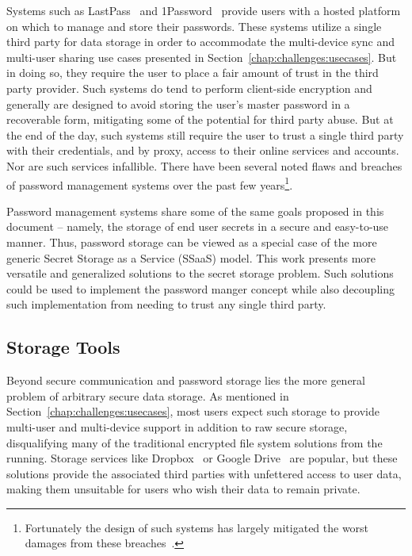 Systems such as LastPass~\cite{lastpass} and
1Password~\cite{onepassword} provide users with a hosted platform on
which to manage and store their passwords. These systems utilize a
single third party for data storage in order to accommodate the
multi-device sync and multi-user sharing use cases presented in
Section~\ref{chap:challenges:usecases}. But in doing so, they require
the user to place a fair amount of trust in the third party
provider. Such systems do tend to perform client-side encryption and
generally are designed to avoid storing the user's master password in
a recoverable form, mitigating some of the potential for third party
abuse. But at the end of the day, such systems still require the user
to trust a single third party with their credentials, and by proxy,
access to their online services and accounts. Nor are such services
infallible. There have been several noted flaws and breaches of
password management systems over the past few
years\footnote{Fortunately the design of such systems has largely
  mitigated the worst damages from these
  breaches~\cite{ducklin2015}.}\cite{blackhat-lastpass,
  changedmy-lastpass, lastpass-blog-breach}.

Password management systems share some of the same goals proposed in
this document -- namely, the storage of end user secrets in a secure
and easy-to-use manner. Thus, password storage can be viewed as a
special case of the more generic Secret Storage as a Service (SSaaS)
model. This work presents more versatile and generalized solutions to
the secret storage problem. Such solutions could be used to implement
the password manger concept while also decoupling such implementation
from needing to trust any single third party.

\subsection{Storage Tools}

Beyond secure communication and password storage lies the more general
problem of arbitrary secure data storage. As mentioned in
Section~\ref{chap:challenges:usecases}, most users expect such storage
to provide multi-user and multi-device support in addition to raw
secure storage, disqualifying many of the traditional encrypted file
system solutions from the running. Storage services like
Dropbox~\cite{dropbox} or Google Drive~\cite{google-drive} are
popular, but these solutions provide the associated third parties with
unfettered access to user data, making them unsuitable for users who
wish their data to remain private.

